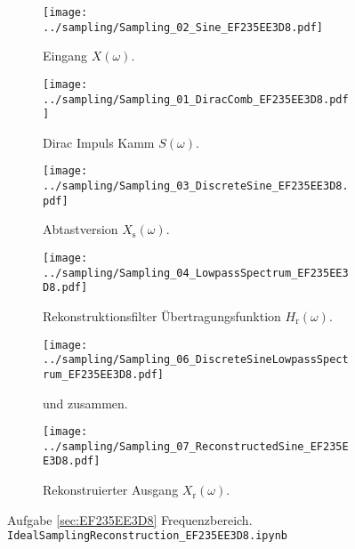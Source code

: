 









\begin{figure*}[h!]
\centering
\begin{subfigure}{0.49\textwidth}
\texttt{[image: ../sampling/Sampling\_02\_Sine\_EF235EE3D8.pdf]}
\caption{Eingang $X(\omega)$.}
\label{fig:Sampling_02_Sine_EF235EE3D8}
\end{subfigure}
\begin{subfigure}{0.49\textwidth}
\texttt{[image: ../sampling/Sampling\_01\_DiracComb\_EF235EE3D8.pdf]}
\caption{Dirac Impuls Kamm $S(\omega)$.}
\label{fig:Sampling_01_DiracComb_EF235EE3D8}
\end{subfigure}
\begin{subfigure}{0.49\textwidth}
\texttt{[image: ../sampling/Sampling\_03\_DiscreteSine\_EF235EE3D8.pdf]}
\caption{Abtastversion $X_\mathrm{s}(\omega)$.}
\label{fig:Sampling_03_DiscreteSine_EF235EE3D8}
\end{subfigure}
\begin{subfigure}{0.49\textwidth}
\texttt{[image: ../sampling/Sampling\_04\_LowpassSpectrum\_EF235EE3D8.pdf]}
\caption{Rekonstruktionsfilter Übertragungsfunktion $H_\mathrm{r}(\omega)$.}
\label{fig:Sampling_04_LowpassSpectrum_EF235EE3D8}
\end{subfigure}
\begin{subfigure}{0.49\textwidth}
\texttt{[image: ../sampling/Sampling\_06\_DiscreteSineLowpassSpectrum\_EF235EE3D8.pdf]}
\caption{
und
zusammen.
}
\label{fig:Sampling_06_DiscreteSineLowpassSpectrum_EF235EE3D8}
\end{subfigure}
\begin{subfigure}{0.49\textwidth}
\texttt{[image: ../sampling/Sampling\_07\_ReconstructedSine\_EF235EE3D8.pdf]}
\caption{Rekonstruierter Ausgang $X_\mathrm{r}(\omega)$.}
\label{fig:Sampling_07_ReconstructedSine_EF235EE3D8}
\end{subfigure}
\caption{Aufgabe \ref{sec:EF235EE3D8} Frequenzbereich. \texttt{IdealSamplingReconstruction\_EF235EE3D8.ipynb}}
\label{fig:EF235EE3D8_FrequencyDomain}
\end{figure*}






